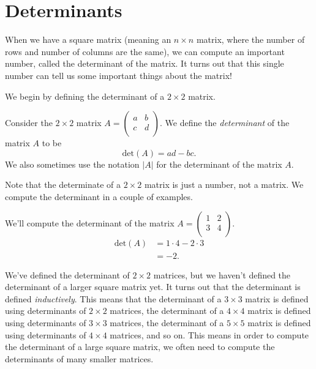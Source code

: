 \documentclass{ximera}
\begin{document}
\section*{Determinants}

When we have a square matrix (meaning an $n\times n$ matrix, where the number of rows and number of columns are the same), we can compute an important number, called the determinant of the matrix. It turns out that this single number can tell us some important things about the matrix!

We begin by defining the determinant of a $2\times 2$ matrix.

\begin{definition}
Consider the $2\times 2$ matrix $A=\left(\begin{array}{cc}a & b \\ c & d\\\end{array}\right)$. We define the \emph{determinant} of the matrix $A$ to be
\[
\textrm{det}(A) = ad-bc.
\]
We also sometimes use the notation $|A|$ for the determinant of the matrix $A$.
\end{definition}

Note that the determinate of a $2\times 2$ matrix is just a number, not a matrix. We compute the determinant in a couple of examples.

\begin{example}
We'll compute the determinant of the matrix $A = \left(\begin{array}{cc}1 & 2 \\ 3 & 4\\\end{array}\right)$.
\begin{align*}
\textrm{det}(A) &= 1\cdot 4 - 2\cdot 3\\
&= -2.
\end{align*}
\end{example}

We've defined the determinant of $2\times 2$ matrices, but we haven't defined the determinant of a larger square matrix yet. It turns out that the determinant is defined \emph{inductively}. This means that the determinant of a $3\times 3$ matrix is defined using determinants of $2\times 2$ matrices, the determinant of a $4\times 4$ matrix is defined using determinants of $3\times 3$ matrices, the determinant of a $5\times 5$ matrix is defined using determinants of $4\times 4$ matrices, and so on. This means in order to compute the determinant of a large square matrix, we often need to compute the determinants of many smaller matrices.
\end{document}

